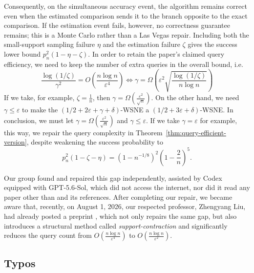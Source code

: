 Consequently, on the simultaneous accuracy event, the algorithm remains correct even when the estimated comparison sends it to the branch opposite to the exact comparison. If the estimation event fails, however, no correctness guarantee remains; this is a Monte Carlo rather than a Las Vegas repair. Including both the small-support sampling failure \(\eta\) and the estimation failure \(\zeta\) gives the success lower bound \(p_n^2(1 - \eta - \zeta)\). In order to retain the paper's claimed query efficiency, we need to keep the number of extra queries in the overall bound, i.e.
\[
  \frac{\log(1 / \zeta)}{\gamma^2} = O\left(\frac{n \log n}{\varepsilon^4}\right) \iff \gamma = \Omega\left(\varepsilon^2\sqrt{\frac{\log(1 / \zeta)}{n \log n}}\right)
\]
If we take, for example, \(\zeta = \frac{1}{n}\), then \(\gamma = \Omega\left(\frac{\varepsilon^2}{\sqrt{n}}\right)\). On the other hand, we need \(\gamma \leq \varepsilon\) to make the \((1 / 2 + 2\varepsilon + \gamma + \delta)\)-WSNE a \((1 / 2 + 3\varepsilon + \delta)\)-WSNE. In conclusion, we must let \(\gamma = \Omega\left(\frac{\varepsilon^2}{\sqrt{n}}\right)\) and \(\gamma \leq \varepsilon\). If we take \(\gamma = \varepsilon\) for example, this way, we repair the query complexity in Theorem~\ref{thm:query-efficient-version}, despite weakening the success probability to
\[
  p_n^2(1 - \zeta - \eta) =
  \left(1 - n^{-1 / 8}\right)^2
  \left(1 - \frac{2}{n}\right)^5.
\]

Our group found and repaired this gap independently, assisted by Codex equipped with GPT-5.6-Sol, which did not access the internet, nor did it read any paper other than \cite{12WSNE} and its references. After completing our repair, we became aware that, recently, on August 1, 2026, our respected professor, Zhengyang Liu, had already posted a preprint \cite{liu2026supportcontractionwellsupportednash}, which not only repairs the same gap, but also introduces a structural method called \textit{support-contraction} and significantly reduces the query count from \(O\left(\frac{n \log n}{\varepsilon^4}\right)\) to \(O\left(\frac{n \log n}{\varepsilon^2}\right)\).

\subsection{Typos}

